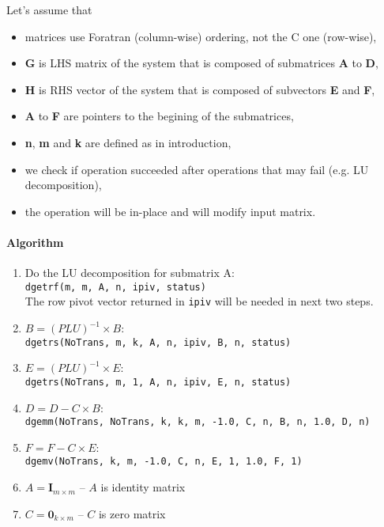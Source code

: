 \documentclass[12pt]{article}
\begin{document}
Let's assume that
\begin{itemize}
    \item matrices use Foratran (column-wise) ordering, not the C one (row-wise),
    \item \textbf{G} is LHS matrix of the system that is composed of submatrices \textbf{A} to \textbf{D},
    \item \textbf{H} is RHS vector of the system that is composed of subvectors \textbf{E} and \textbf{F},
    \item \textbf{A} to \textbf{F} are pointers to the begining of the submatrices,
    \item \textbf{n}, \textbf{m} and \textbf{k} are defined as in introduction,
    \item we check if operation succeeded after operations that may fail (e.g. LU decomposition),
    \item the operation will be in-place and will modify input matrix.
\end{itemize}

\paragraph{Algorithm}
\begin{enumerate}
    \item Do the LU decomposition for submatrix A: \\ \texttt{dgetrf(m, m, A, n, ipiv, status)} \\ The row pivot vector returned in \texttt{ipiv} will be needed in next two steps.
    \item $B = (PLU)^{-1} \times B$: \\ \texttt{dgetrs(NoTrans, m, k, A, n, ipiv, B, n, status)}
    \item $E = (PLU)^{-1} \times E$: \\ \texttt{dgetrs(NoTrans, m, 1, A, n, ipiv, E, n, status)}
    \item $D = D - C \times B$: \\ \texttt{dgemm(NoTrans, NoTrans, k, k, m, -1.0, C, n, B, n, 1.0, D, n)}
    \item $F = F - C \times E$: \\ \texttt{dgemv(NoTrans, k, m, -1.0, C, n, E, 1, 1.0, F, 1)}
    \item $A = \boldsymbol{I}_{m × m}$ – $A$ is identity matrix
    \item $C = \boldsymbol{0}_{k × m}$ – $C$ is zero matrix
\end{enumerate}
\end{document}

